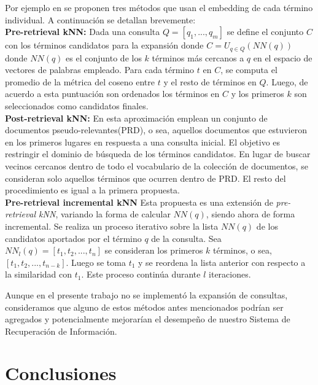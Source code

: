 \documentclass{llncs}
\begin{document}
Por ejemplo en \cite{190} se proponen tres métodos que usan el embedding de cada término individual. A continuación se detallan brevemente:
\\

\textbf{Pre-retrieval kNN: } Dada una consulta $Q = [q_1, ..., q_m]$ se define el conjunto $C$ con los términos candidatos para la expansión donde $C = U_{q \in Q}(NN(q)) $ donde $NN(q)$ es el conjunto de los $k$ términos más cercanos a $q$ en el espacio de vectores de palabras empleado. Para cada término $t$ en $C$, se computa el promedio de la métrica del coseno entre $t$ y el resto de términos en $Q$. Luego, de acuerdo a esta puntuación son ordenados los términos en $C$ y los primeros $k$ son seleccionados como candidatos finales.
\\

\textbf{Post-retrieval kNN: } En esta aproximación emplean un conjunto de documentos pseudo-relevantes(PRD), o sea, aquellos documentos que estuvieron en los primeros lugares en respuesta a una consulta inicial. El objetivo es restringir el dominio de búsqueda de los términos candidatos. En lugar de buscar vecinos cercanos dentro de todo el vocabulario de la colección de documentos, se consideran solo aquellos términos que ocurren dentro de PRD. El resto del procedimiento es igual a la primera propuesta.
\\

\textbf{Pre-retrieval incremental kNN}
Esta propuesta es una extensión de \textit{pre-retrieval kNN}, variando la forma de calcular $NN(q)$, siendo ahora de forma incremental. Se realiza un proceso iterativo sobre la lista $NN(q)$ de los candidatos aportados por el término $q$ de la consulta. Sea $NN_l(q) = [t_1, t_2, ..., t_n]$ se consideran los primeros $k$ términos, o sea, $[t_1, t_2, ..., t_{n-k}]$. Luego se toma $t_1$ y se reordena la lista anterior con respecto a la similaridad con $t_1$. Este proceso continúa durante $l$ iteraciones.

Aunque en el presente trabajo no se implementó la expansión de consultas, consideramos que alguno de estos métodos antes mencionados podrían ser agregados y potencialmente mejorarían el desempeño de nuestro Sistema de Recuperación de Información.

\section{Conclusiones}
 
\end{document}
